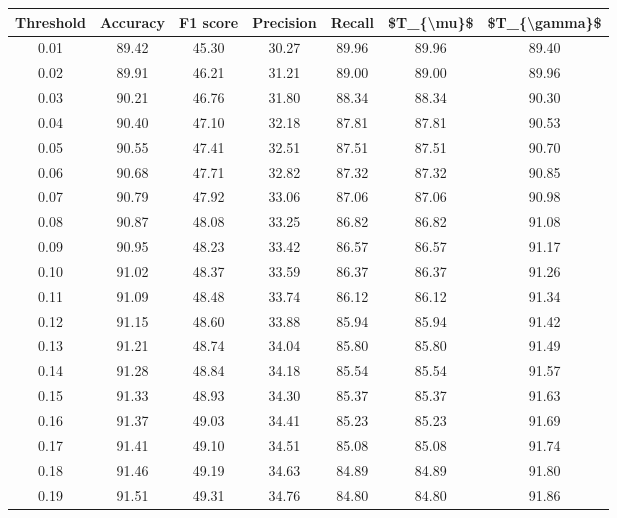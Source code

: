 \begin{tabular}{|c|c|c|c|c|c|c|}
\hline
 Threshold &  Accuracy &  F1 score &  Precision &  Recall &  \$T\_\{\textbackslash mu\}\$ &  \$T\_\{\textbackslash gamma\}\$ \\
\hline
      0.01 &     89.42 &     45.30 &      30.27 &   89.96 &      89.96 &         89.40 \\
      0.02 &     89.91 &     46.21 &      31.21 &   89.00 &      89.00 &         89.96 \\
      0.03 &     90.21 &     46.76 &      31.80 &   88.34 &      88.34 &         90.30 \\
      0.04 &     90.40 &     47.10 &      32.18 &   87.81 &      87.81 &         90.53 \\
      0.05 &     90.55 &     47.41 &      32.51 &   87.51 &      87.51 &         90.70 \\
      0.06 &     90.68 &     47.71 &      32.82 &   87.32 &      87.32 &         90.85 \\
      0.07 &     90.79 &     47.92 &      33.06 &   87.06 &      87.06 &         90.98 \\
      0.08 &     90.87 &     48.08 &      33.25 &   86.82 &      86.82 &         91.08 \\
      0.09 &     90.95 &     48.23 &      33.42 &   86.57 &      86.57 &         91.17 \\
      0.10 &     91.02 &     48.37 &      33.59 &   86.37 &      86.37 &         91.26 \\
      0.11 &     91.09 &     48.48 &      33.74 &   86.12 &      86.12 &         91.34 \\
      0.12 &     91.15 &     48.60 &      33.88 &   85.94 &      85.94 &         91.42 \\
      0.13 &     91.21 &     48.74 &      34.04 &   85.80 &      85.80 &         91.49 \\
      0.14 &     91.28 &     48.84 &      34.18 &   85.54 &      85.54 &         91.57 \\
      0.15 &     91.33 &     48.93 &      34.30 &   85.37 &      85.37 &         91.63 \\
      0.16 &     91.37 &     49.03 &      34.41 &   85.23 &      85.23 &         91.69 \\
      0.17 &     91.41 &     49.10 &      34.51 &   85.08 &      85.08 &         91.74 \\
      0.18 &     91.46 &     49.19 &      34.63 &   84.89 &      84.89 &         91.80 \\
      0.19 &     91.51 &     49.31 &      34.76 &   84.80 &      84.80 &         91.86 \\

\end{tabular}
